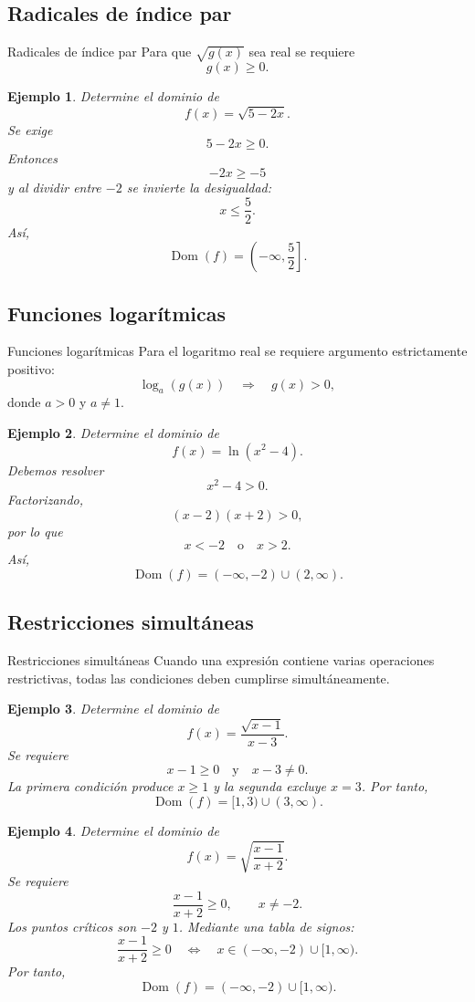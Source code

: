 \documentclass[aspectratio=169,10pt]{beamer}
\newtheorem{ejemplo}{Ejemplo}
\newcommand{\Dom}{\operatorname{Dom}}
\begin{document}
\subsection{Radicales de índice par}
\begin{frame}{Radicales de índice par}
Para que $\sqrt{g(x)}$ sea real se requiere
\[
g(x)\geq0.
\]

\begin{ejemplo}
Determine el dominio de
\[
f(x)=\sqrt{5-2x}.
\]
Se exige
\[
5-2x\geq0.
\]
Entonces
\[
-2x\geq-5
\]
y al dividir entre $-2$ se invierte la desigualdad:
\[
x\leq\frac52.
\]
Así,
\[
\Dom(f)=\left(-\infty,\frac52\right].
\]
\end{ejemplo}
\end{frame}
\subsection{Funciones logarítmicas}
\begin{frame}{Funciones logarítmicas}
Para el logaritmo real se requiere argumento estrictamente positivo:
\[
\log_a(g(x))
\quad\Longrightarrow\quad
g(x)>0,
\]
donde $a>0$ y $a\neq1$.

\begin{ejemplo}
Determine el dominio de
\[
f(x)=\ln(x^2-4).
\]
Debemos resolver
\[
x^2-4>0.
\]
Factorizando,
\[
(x-2)(x+2)>0,
\]
por lo que
\[
x<-2\quad\text{o}\quad x>2.
\]
Así,
\[
\Dom(f)=(-\infty,-2)\cup(2,\infty).
\]
\end{ejemplo}
\end{frame}
\subsection{Restricciones simultáneas}
\begin{frame}{Restricciones simultáneas}
Cuando una expresión contiene varias operaciones restrictivas, todas las
condiciones deben cumplirse simultáneamente.

\begin{ejemplo}
Determine el dominio de
\[
f(x)=\frac{\sqrt{x-1}}{x-3}.
\]
Se requiere
\[
x-1\geq0
\quad\text{y}\quad
x-3\neq0.
\]
La primera condición produce $x\geq1$ y la segunda excluye $x=3$. Por tanto,
\[
\Dom(f)=[1,3)\cup(3,\infty).
\]
\end{ejemplo}

\begin{ejemplo}
Determine el dominio de
\[
f(x)=\sqrt{\frac{x-1}{x+2}}.
\]
Se requiere
\[
\frac{x-1}{x+2}\geq0,
\qquad x\neq-2.
\]
Los puntos críticos son $-2$ y $1$. Mediante una tabla de signos:
\[
\frac{x-1}{x+2}\geq0
\quad\Longleftrightarrow\quad
x\in(-\infty,-2)\cup[1,\infty).
\]
Por tanto,
\[
\Dom(f)=(-\infty,-2)\cup[1,\infty).
\]
\end{ejemplo}

\end{frame}
\end{document}
